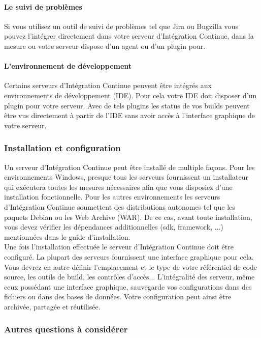       \paragraph{Le suivi de problèmes} Si vous utilisez un outil de suivi de problèmes tel que Jira ou Bugzilla vous pouvez l'intégrer directement dans votre serveur d'Intégration Continue, dans la mesure ou votre serveur dispose d'un agent ou d'un plugin pour.
      \paragraph{L'environnement de développement} Certains serveurs d'Intégration Continue peuvent être intégrés aux environnements de développement (IDE). Pour cela votre IDE doit disposer d'un plugin pour votre serveur. Avec de tels plugins les status de vos builds peuvent être vus directement à partir de l'IDE sans avoir accès à l'interface graphique de votre serveur.

      \subsubsection{Installation et configuration}
      Un serveur d'Intégration Continue peut être installé de multiple façons. Pour les environnements Windows, presque tous les serveurs fournissent un installateur qui exécutera toutes les mesures nécessaires afin que vous disposiez d'une installation fonctionnelle. Pour les autres environnements les serveurs d'Intégration Continue soumettent des distributions autonomes tel que les paquets Debian ou les Web Archive (WAR). De ce cas, avant toute installation, vous devez vérifier les dépendances additionnelles (sdk, framework, ...) mentionnées dans le guide d'installation.\\

      Une fois l'installation effectuée le serveur d'Intégration Continue doit être configuré. La plupart des serveurs fournissent une interface graphique pour cela. Vous devrez en autre définir l'emplacement et le type de votre référentiel de code source, les outils de build, les contrôles d'accès... L'intégralité des serveur, même ceux possédant une interface graphique, sauvegarde vos configurations dans des fichiers ou dans des bases de données. Votre configuration peut ainsi être archivée, partagée et réutilisée.

      \subsubsection{Autres questions à considérer}
